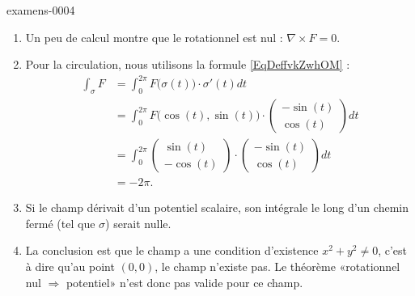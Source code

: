 
\begin{corrige}{examens-0004}

    \begin{enumerate}
        \item
            Un peu de calcul montre que le rotationnel est nul : \( \nabla \times F=0\).
        \item
            Pour la circulation, nous utilisons la formule \eqref{EqDeffvkZwhOM} :
            \begin{subequations}
                \begin{align}
                    \int_{\sigma}F&=\int_0^{2\pi} F\big( \sigma(t) \big)\cdot \sigma'(t)dt\\
                    &=\int_0^{2\pi}F\big( \cos(t),\sin(t) \big)\cdot\begin{pmatrix}
                        -\sin(t)    \\ 
                        \cos(t)    
                    \end{pmatrix}dt\\
                    &=\int_0^{2\pi}\begin{pmatrix}
                        \sin(t)    \\ 
                        -\cos(t)    
                    \end{pmatrix}\cdot
                    \begin{pmatrix}
                        -\sin(t)    \\ 
                        \cos(t)    
                    \end{pmatrix}dt\\
                    &=-2\pi.
                \end{align}
            \end{subequations}
        \item
            Si le champ dérivait d'un potentiel scalaire, son intégrale le long d'un chemin fermé (tel que \( \sigma\)) serait nulle.
        \item
            La conclusion est que le champ a une condition d'existence \( x^2+y^2\neq 0\), c'est à dire qu'au point \( (0,0)\), le champ n'existe pas. Le théorème «rotationnel nul \( \Rightarrow\) potentiel» n'est donc pas valide pour ce champ.

    \end{enumerate}

\end{corrige}
